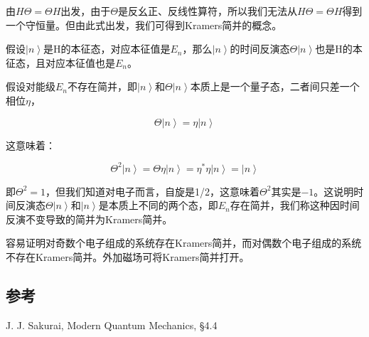 由$H \Theta = \Theta H$出发，由于$\Theta$是反幺正、反线性算符，所以我们无法从$H \Theta = \Theta H$得到一个守恒量。但由此式出发，我们可得到Kramers简并的概念。

假设$\left| n \right\rangle$是H的本征态，对应本征值是$E_n$，那么$\left| n \right\rangle$的时间反演态$\Theta \left| n \right\rangle$也是H的本征态，且对应本征值也是$E_n$。

假设对能级$E_n$不存在简并，即$\left| n \right\rangle$和$\Theta \left| n \right\rangle$本质上是一个量子态，二者间只差一个相位$\eta$，

\begin{equation}
\Theta \left| n \right\rangle = \eta \left| n \right\rangle
\end{equation}

这意味着：

\begin{equation}
\Theta^2 \left| n \right\rangle = \Theta \eta \left| n \right\rangle = \eta^* \eta \left| n \right\rangle = \left| n \right\rangle
\end{equation}

即$\Theta^2 =1 $，但我们知道对电子而言，自旋是1/2，这意味着$\Theta^2 $其实是$-1$。这说明时间反演态$\Theta \left| n \right\rangle $和$\left| n \right\rangle$是本质上不同的两个态，即$E_n$存在简并，我们称这种因时间反演不变导致的简并为Kramers简并。

容易证明对奇数个电子组成的系统存在Kramers简并，而对偶数个电子组成的系统不存在Kramers简并。外加磁场可将Kramers简并打开。

\subsection*{参考}

J. J. Sakurai, Modern Quantum Mechanics, \S 4.4